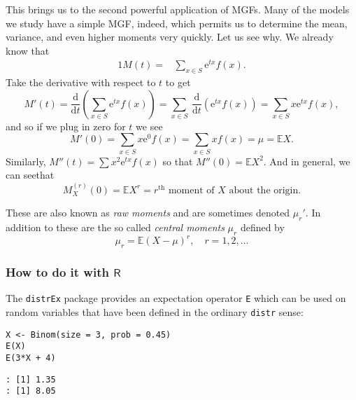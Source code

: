 This brings us to the second powerful application of MGFs. Many of the
models we study have a simple MGF, indeed, which permits us to
determine the mean, variance, and even higher moments very
quickly. Let us see why. We already know that
\begin{alignat*}{1}
M(t)= & \sum_{x\in S}\mathrm{e}^{tx}f(x).
\end{alignat*}
Take the derivative with respect to \(t\) to get
\begin{equation}
M'(t)=\frac{\mathrm{d}}{\mathrm{d} t}\left(\sum_{x\in S}\mathrm{e}^{tx}f(x)\right)=\sum_{x\in S}\ \frac{\mathrm{d}}{\mathrm{d} t}\left(\mathrm{e}^{tx}f(x)\right)=\sum_{x\in S}x\mathrm{e}^{tx}f(x),
\end{equation}
and so if we plug in zero for \(t\) we see
\begin{equation}
M'(0)=\sum_{x\in S}x\mathrm{e}^{0}f(x)=\sum_{x\in S}xf(x)=\mu=\mathbb{E} X.
\end{equation}
Similarly, \(M''(t) = \sum x^{2} \mathrm{e}^{tx} f(x) \) so that
\(M''(0) = \mathbb{E} X^{2}\). And in general, we can
seethat
\begin{equation}
M_{X}^{(r)}(0)=\mathbb{E} X^{r}=\mbox{\(r^{\mathrm{th}}\) moment of \(X\) about the origin.}
\end{equation}

These are also known as \emph{raw moments} and are sometimes denoted
\(\mu_{r}'\). In addition to these are the so called \emph{central moments}
\(\mu_{r}\) defined by
\begin{equation}
\mu_{r}=\mathbb{E}(X-\mu)^{r},\quad r=1,2,\ldots
\end{equation}

\subsubsection{How to do it with \(\mathsf{R}\)}
\label{sec-5-4-2-3}

The \texttt{distrEx} package \cite{distrEx} provides an expectation operator
\texttt{E} which can be used on random variables that have been defined in
the ordinary \texttt{distr} sense:

\begin{verbatim}
X <- Binom(size = 3, prob = 0.45)
E(X)
E(3*X + 4)
\end{verbatim}

\begin{verbatim}
: [1] 1.35
: [1] 8.05
\end{verbatim}

